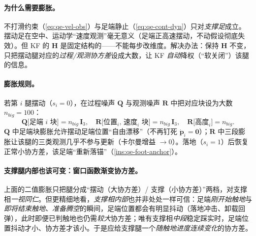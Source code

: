 \paragraph{为什么需要膨胀。}
不打滑约束（\cref{eq:qe-vel-obs}）与足端静止（\cref{eq:qe-cont-dyn}）只对\emph{支撑足}成立。摆动足在空中、运动学“速度观测”毫无意义（足端正高速摆动，不动假设彻底失效）。但 KF 的 $\mathbf{H}$ 是固定结构的——不能每步改维度。解决办法：保持 $\mathbf{H}$ 不变，只把摆动腿对应的\emph{过程/观测协方差}设成大数，让 KF \emph{自动}降权（“软关闭”）该腿的信息\cite{yu2021quadruped}。

\paragraph{膨胀规则。}
若第 $i$ 腿摆动（$s_i=0$），在过程噪声 $\mathbf{Q}$ 与观测噪声 $\mathbf{R}$ 中把对应块设为大数 $n_{big}=100$\cite{yu2021quadruped}：
\begin{equation}
  \mathbf{Q}\big[\text{足端 }i\text{ 块}\big]=n_{big}\,\mathbf{I}_3,
  \quad
  \mathbf{R}\big[\text{位置}_i,\,\text{速度}_i\text{ 块}\big]=n_{big}\,\mathbf{I}_3,
  \quad
  \mathbf{R}\big[\text{高度}_i\big]=n_{big}.
  \label{eq:qe-cov-inflate}
\end{equation}
$\mathbf{Q}$ 中足端块膨胀允许摆动足端位置“自由漂移”（不再钉死 $\dot{\boldsymbol p}_i=\boldsymbol 0$）；$\mathbf{R}$ 中三段膨胀让该腿的三类观测几乎不参与更新（卡尔曼增益 $\to0$）。落地（$s_i=1$）后恢复正常小协方差，该足端“重新落锚”（\cref{ins:qe-foot-anchor}）。

\paragraph{支撑腿内部也该可变：窗口函数渐变协方差。}
上面的二值膨胀只把腿分成“摆动（大协方差）/ 支撑（小协方差）”两档，对支撑相\emph{一视同仁}。但更精细地看，\emph{支撑相内部}也并非处处一样可信：足端\emph{刚开始触地}与\emph{即将结束触地、准备腾空}的瞬间，足端位置都会有明显抖动（落地冲击、卸载回弹），此时即便已判触地也仍需\emph{较大}协方差；唯有支撑相\emph{中段}稳定踩实时，足端位置抖动才小、协方差才该小。于是应给支撑腿一个\emph{随触地进度连续变化}的协方差\cite{unitree2023quadruped}。

